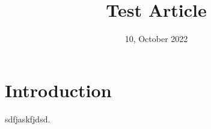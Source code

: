 \documentclass{article}
\title{Test Article}
\date{10, October 2022}
\begin{document}
\maketitle

\section{Introduction}

\par sdfjaskfjdsd.
\end{document}
